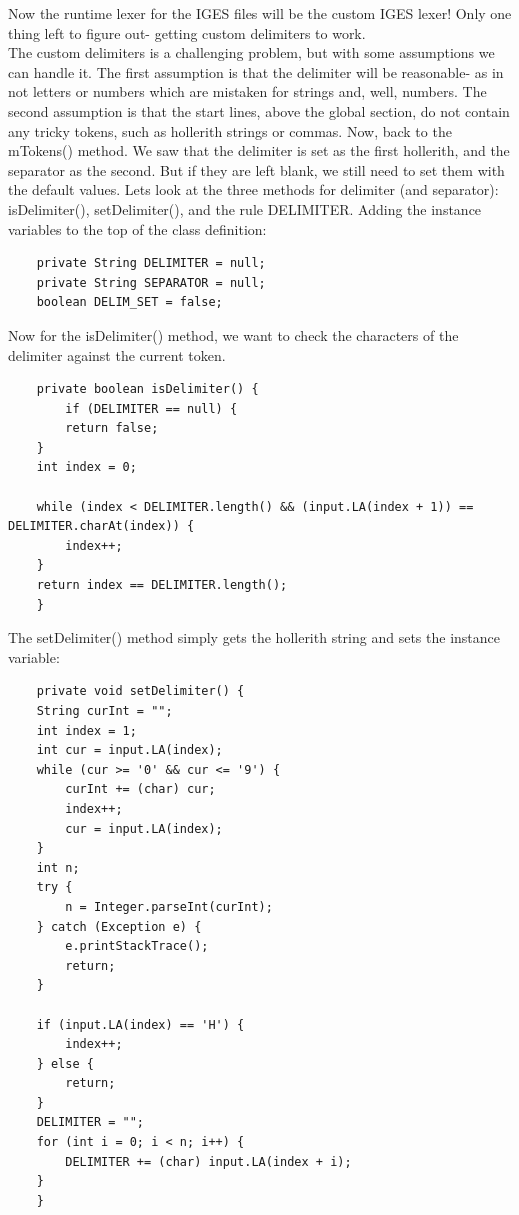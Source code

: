 Now the runtime lexer for the IGES files will be the custom IGES lexer! Only one thing left to figure out- getting custom delimiters to work.\\
The custom delimiters is a challenging problem, but with some assumptions we can handle it. The first assumption is that the delimiter will be reasonable- as in not letters or numbers which are mistaken for strings and, well, numbers. The second assumption is that the start lines, above the global section, do not contain any tricky tokens, such as hollerith strings or commas. Now, back to the mTokens() method. We saw that the delimiter is set as the first hollerith, and the separator as the second. But if they are left blank, we still need to set them with the default values. Lets look at the three methods for delimiter (and separator): isDelimiter(), setDelimiter(), and the rule DELIMITER. Adding the instance variables to the top of the class definition:

\begin{Verbatim}
    private String DELIMITER = null;
    private String SEPARATOR = null;
    boolean DELIM_SET = false;
\end{Verbatim}

Now for the isDelimiter() method, we want to check the characters of the delimiter against the current token.

\begin{Verbatim}
    private boolean isDelimiter() {
        if (DELIMITER == null) {
	    return false;
	}
	int index = 0;

	while (index < DELIMITER.length() && (input.LA(index + 1)) == DELIMITER.charAt(index)) {
	    index++;
	}
	return index == DELIMITER.length();
    }
\end{Verbatim}

The setDelimiter() method simply gets the hollerith string and sets the instance variable:

\begin{Verbatim}
    private void setDelimiter() {
	String curInt = "";
	int index = 1;
	int cur = input.LA(index);
	while (cur >= '0' && cur <= '9') {
	    curInt += (char) cur;
	    index++;
	    cur = input.LA(index);
	}
	int n;
	try {
	    n = Integer.parseInt(curInt);
	} catch (Exception e) {
	    e.printStackTrace();
	    return;
	}

	if (input.LA(index) == 'H') {
	    index++;
	} else {
	    return;
	}
	DELIMITER = "";
	for (int i = 0; i < n; i++) {
	    DELIMITER += (char) input.LA(index + i);
	}
    }
\end{Verbatim}


